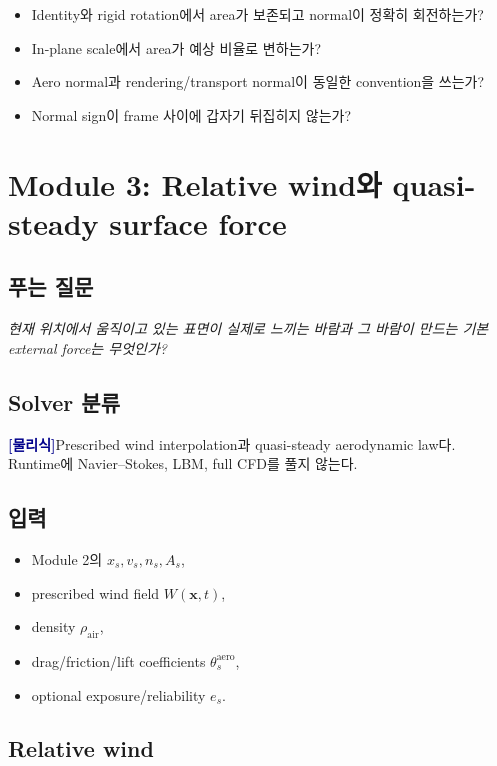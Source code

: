 \documentclass[11pt,a4paper]{article}
\newcommand{\physics}{\textcolor{darkblue}{\textbf{[물리식]}}}
\begin{document}
\begin{itemize}[leftmargin=1.5em]
  \item Identity와 rigid rotation에서 area가 보존되고 normal이 정확히 회전하는가?
  \item In-plane scale에서 area가 예상 비율로 변하는가?
  \item Aero normal과 rendering/transport normal이 동일한 convention을 쓰는가?
  \item Normal sign이 frame 사이에 갑자기 뒤집히지 않는가?
\end{itemize}

\section{Module 3: Relative wind와 quasi-steady surface force}

\subsection*{푸는 질문}

\emph{현재 위치에서 움직이고 있는 표면이 실제로 느끼는 바람과
그 바람이 만드는 기본 external force는 무엇인가?}

\subsection*{Solver 분류}

\physics Prescribed wind interpolation과 quasi-steady aerodynamic law다.
Runtime에 Navier--Stokes, LBM, full CFD를 풀지 않는다.

\subsection*{입력}

\begin{itemize}[leftmargin=1.5em]
  \item Module 2의 \(x_s,v_s,n_s,A_s\),
  \item prescribed wind field \(W(\mathbf x,t)\),
  \item density \(\rho_{\mathrm{air}}\),
  \item drag/friction/lift coefficients \(\theta_s^{\mathrm{aero}}\),
  \item optional exposure/reliability \(e_s\).
\end{itemize}

\subsection*{Relative wind}
\end{document}
